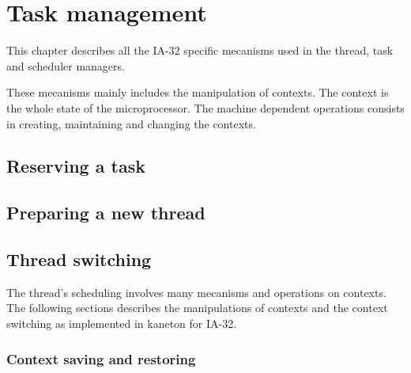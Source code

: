 %
%
%
%
%
%

%
%

\chapter{Task management}

This chapter describes all the IA-32 specific mecanisms used in the
thread, task and scheduler managers.

These mecanisms mainly includes the manipulation of contexts. The
context is the whole state of the microprocessor. The machine
dependent operations consists in creating, maintaining and changing
the contexts.

\newpage

%
%

\section{Reserving a task} %

%
%

\section{Preparing a new thread} %

%
%

\section{Thread switching}

The thread's scheduling involves many mecanisms and operations on
contexts. The following sections describes the manipulations of
contexts and the context switching as implemented in kaneton for
IA-32.

%
%

\subsection{Context saving and restoring}


